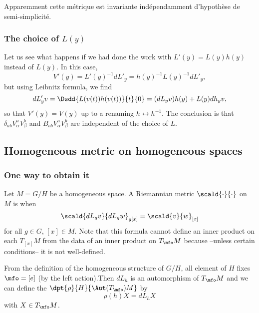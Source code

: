 \begin{probleme}
Apparemment cette métrique est invariante indépendamment d'hypothèse de semi-simplicité.
\end{probleme}

\subsubsection{The choice of \texorpdfstring{$L(y)$}{L(y)}}

Let us see what happens if we had done the work with $L'(y)=L(y)h(y)$ instead of $L(y)$. In this case, 
\[
   V'(y)=L'(y)^{-1} dL'_y=h(y)^{-1} L(y)^{-1} dL'_y,
\]
but using Leibnitz formula, we find
\begin{equation}
   dL'_yv=\Dsdd{L(v(t))h(v(t))}{t}{0}
         =(dL_yv)h(y)+L(y)dh_yv,
\end{equation}
so that $V'(y)=V(y)$ up to a renaming $h\leftrightarrow h^{-1}$. The conclusion is that $\delta_{ab}V_{\alpha}^a V_{\beta}^b$ and $B_{ab}V_{\alpha}^aV_{\beta}^b$ are independent of the choice of $L$.

\subsection{Homogeneous metric on homogeneous spaces}

\subsubsection{One way to obtain it}

Let $M=G/H$ be a homogeneous space. A Riemannian metric $\scald{\cdot}{\cdot}$ on $M$ is  when
\begin{equation}\label{eq:def:homo_metric}
\scald{dL_gv}{dL_gw}_{g[x]}=\scald{v}{w}_{[x]}
\end{equation}
for all $g\in G$, $[x]\in M$. Note that this formula cannot define an inner product on each $T_{[x]}M$ from the data of an inner product on $T_{\mfo}M$ because --unless certain conditions-- it is not well-defined.

From the definition of the homogeneous structure of $G/H$, all element of $H$ fixes $\mfo=[e]$ (by the left action).Then $dL_h$ is an automorphism of $T_{\mfo}M$ and we can define the  $\dpt{\rho}{H}{\Aut(T_{\mfo})M}$ by
\[
   \rho(h)X=dL_hX
\]
with $X\in T_{\mfo}M$.


